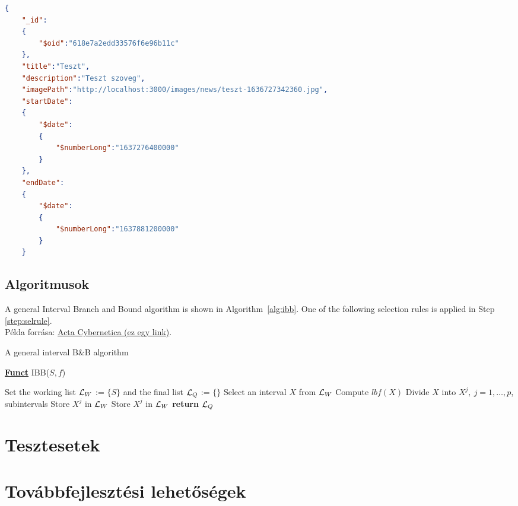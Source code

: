 \begin{lstlisting}[language={JSON}]
{
	"_id":
	{
		"$oid":"618e7a2edd33576f6e96b11c"
	},
	"title":"Teszt",
	"description":"Teszt szoveg",
	"imagePath":"http://localhost:3000/images/news/teszt-1636727342360.jpg",
	"startDate":
	{
		"$date":
		{
			"$numberLong":"1637276400000"
		}
	},
	"endDate":
	{
		"$date":
		{
			"$numberLong":"1637881200000"
		}
	}
\end{lstlisting}

\subsection{Algoritmusok} %

A general Interval Branch and Bound algorithm is shown in Algorithm~\ref{alg:ibb}. One of the following selection rules is applied in Step \ref{step:selrule}.\\
Példa forrása: \href{https://www.inf.u-szeged.hu/actacybernetica/}{Acta Cybernetica (ez egy link)}.

\begin{algorithm}[H]
\caption{A general interval B\&B algorithm} 
\label{alg:ibb} 
\textbf{\underline{Funct}} IBB($S,f$)
\begin{algorithmic}[1] %
\State Set the working list ${\cal L}_W$ := $\{S\}$ and the final list ${\cal L}_Q$ := $\{\}$     
 \label{alg:igoend}
	\State  Select an interval $X$ from ${\cal L}_W$ \label{step:selrule}  
	\State Compute $lbf(X)$ 		  
	 
		\State Divide $X$ into $X^j,\ j=1,\dots, p$, subintervals   
			 
				\State Store $X^j$ in ${\cal L}_W$ 
			\Else
				\State Store $X^j$ in ${\cal L}_W$ 
			\EndIf
		\EndFor  
	\EndIf
\EndWhile
\State \textbf{return} ${\cal L}_Q$
\end{algorithmic}
\end{algorithm}

\section{Tesztesetek}

\section{Továbbfejlesztési lehetőségek}